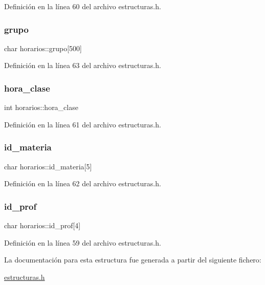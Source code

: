 Definición en la línea 60 del archivo estructuras.\+h.

\mbox{\label{structhorarios_a435f7d8029b65cba591011c6d86ce284}} 
\subsubsection{\texorpdfstring{grupo}{grupo}}
{\footnotesize\ttfamily char horarios\+::grupo\mbox{[}500\mbox{]}}



Definición en la línea 63 del archivo estructuras.\+h.

\mbox{\label{structhorarios_a5ed630f7244ecfbe4c29f08ffb009472}} 
\subsubsection{\texorpdfstring{hora\+\_\+clase}{hora\_clase}}
{\footnotesize\ttfamily int horarios\+::hora\+\_\+clase}



Definición en la línea 61 del archivo estructuras.\+h.

\mbox{\label{structhorarios_adbe2c73c92199ce4ac6e03b7cdbe9b72}} 
\subsubsection{\texorpdfstring{id\+\_\+materia}{id\_materia}}
{\footnotesize\ttfamily char horarios\+::id\+\_\+materia\mbox{[}5\mbox{]}}



Definición en la línea 62 del archivo estructuras.\+h.

\mbox{\label{structhorarios_a10531356ac4d127379c96ad1006873f8}} 
\subsubsection{\texorpdfstring{id\+\_\+prof}{id\_prof}}
{\footnotesize\ttfamily char horarios\+::id\+\_\+prof\mbox{[}4\mbox{]}}



Definición en la línea 59 del archivo estructuras.\+h.



La documentación para esta estructura fue generada a partir del siguiente fichero\+:\begin{DoxyCompactItemize}
\item 
\mbox{\hyperlink{estructuras_8h}{estructuras.\+h}}\end{DoxyCompactItemize}
